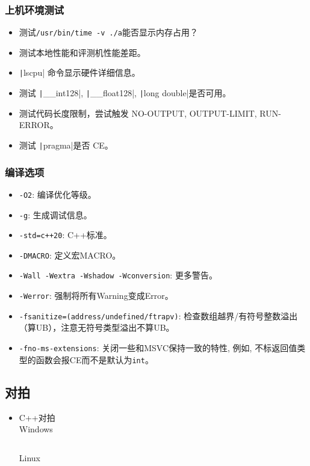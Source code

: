 \documentclass[a4paper, twoside]{article}
\begin{document}
    \subsubsection{上机环境测试}
    \begin{itemize}
        \item 测试\texttt{/usr/bin/time -v ./a}能否显示内存占用？
        \item 测试本地性能和评测机性能差距。
        \item \texttt|lscpu| 命令显示硬件详细信息。
        \item 测试 \texttt|__int128|, \texttt|__float128|, \texttt|long double|是否可用。
        \item 测试代码长度限制，尝试触发 NO-OUTPUT, OUTPUT-LIMIT, RUN-ERROR。
        \item 测试 \texttt|pragma|是否 CE。
    \end{itemize}

    \subsubsection{编译选项}
    \begin{itemize}
        \item \texttt{-O2}: 编译优化等级。
        \item \texttt{-g}: 生成调试信息。
        \item \texttt{-std=c++20}: C++标准。
        \item \texttt{-DMACRO}: 定义宏MACRO。
        \item \texttt{-Wall -Wextra -Wshadow -Wconversion}: 更多警告。
        \item \texttt{-Werror}: 强制将所有Warning变成Error。
        \item \texttt{-fsanitize=(address/undefined/ftrapv)}: 检查数组越界/有符号整数溢出（算UB），注意无符号类型溢出不算UB。
        \item \texttt{-fno-ms-extensions}: 关闭一些和MSVC保持一致的特性, 例如, 不标返回值类型的函数会报CE而不是默认为\texttt{int}。
    \end{itemize}

\subsection{对拍}
\begin{itemize}
    \item C++对拍\\
    Windows
    \inputminted{cpp}{../src/附录/C++对拍（Windows）.cpp}

    Linux
    \inputminted{cpp}{../src/附录/C++对拍（Linux）.cpp}
\end{itemize}
\end{document}

